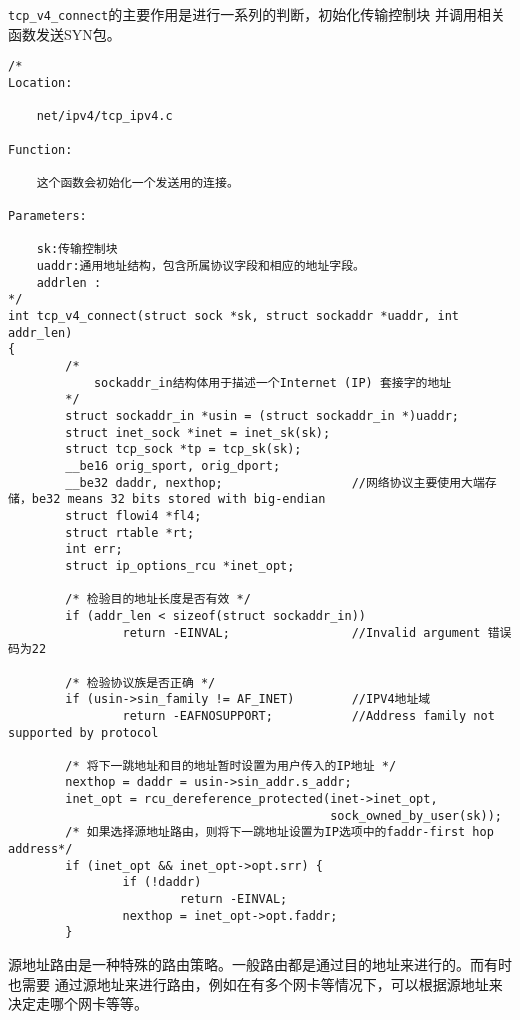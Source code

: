 			\texttt{tcp_v4_connect}的主要作用是进行一系列的判断，初始化传输控制块
			并调用相关函数发送SYN包。
\begin{verbatim}
/*
Location:

	net/ipv4/tcp_ipv4.c

Function:

	这个函数会初始化一个发送用的连接。

Parameters:

	sk:传输控制块
	uaddr:通用地址结构，包含所属协议字段和相应的地址字段。
	addrlen	:
*/
int tcp_v4_connect(struct sock *sk, struct sockaddr *uaddr, int addr_len)
{
		/*
			sockaddr_in结构体用于描述一个Internet (IP) 套接字的地址		
		*/
        struct sockaddr_in *usin = (struct sockaddr_in *)uaddr;	
        struct inet_sock *inet = inet_sk(sk);
        struct tcp_sock *tp = tcp_sk(sk);
        __be16 orig_sport, orig_dport;
        __be32 daddr, nexthop;					//网络协议主要使用大端存储，be32 means 32 bits stored with big-endian
        struct flowi4 *fl4;
        struct rtable *rt;
        int err;
        struct ip_options_rcu *inet_opt;

        /* 检验目的地址长度是否有效 */
        if (addr_len < sizeof(struct sockaddr_in))
                return -EINVAL;					//Invalid argument 错误码为22

        /* 检验协议族是否正确 */
        if (usin->sin_family != AF_INET)		//IPV4地址域
                return -EAFNOSUPPORT;			//Address family not supported by protocol

        /* 将下一跳地址和目的地址暂时设置为用户传入的IP地址 */
        nexthop = daddr = usin->sin_addr.s_addr;
        inet_opt = rcu_dereference_protected(inet->inet_opt,
                                             sock_owned_by_user(sk));
        /* 如果选择源地址路由，则将下一跳地址设置为IP选项中的faddr-first hop address*/
        if (inet_opt && inet_opt->opt.srr) {
                if (!daddr)
                        return -EINVAL;
                nexthop = inet_opt->opt.faddr;
        }
\end{verbatim}
			源地址路由是一种特殊的路由策略。一般路由都是通过目的地址来进行的。而有时也需要
			通过源地址来进行路由，例如在有多个网卡等情况下，可以根据源地址来决定走哪个网卡等等。

